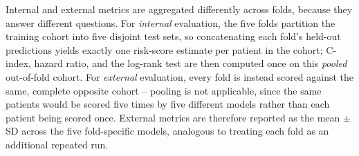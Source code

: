 Internal and external metrics are aggregated differently across folds, because
they answer different questions. For \emph{internal} evaluation, the five folds
partition the training cohort into five disjoint test sets, so concatenating
each fold's held-out predictions yields exactly one risk-score estimate per
patient in the cohort; C-index, hazard ratio, and the log-rank test are then
computed once on this \emph{pooled} out-of-fold cohort. For \emph{external}
evaluation, every fold is instead scored against the same, complete opposite
cohort -- pooling is not applicable, since the same patients would be scored
five times by five different models rather than each patient being scored once.
External metrics are therefore reported as the mean $\pm$ SD across the five
fold-specific models, analogous to treating each fold as an additional
repeated run.

